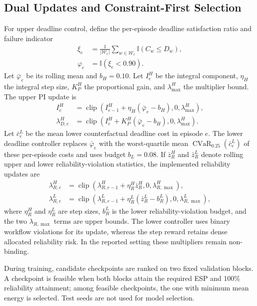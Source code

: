 \documentclass[lettersize,journal]{IEEEtran}
\newcommand{\ind}{\mathbb{I}}
\newcommand{\clip}{\operatorname{clip}}
\newcommand{\cvar}{\operatorname{CVaR}}
\begin{document}
\subsection{Dual Updates and Constraint-First Selection}
For upper deadline control, define the per-episode deadline satisfaction ratio
and failure indicator
\begin{align}
 \xi_e&=\frac{1}{|\mathcal{W}_e|}\sum_{w\in\mathcal{W}_e}
 \ind(C_w\le D_w),\\
 \varphi_e&=\ind(\xi_e<0.90).
 \label{eq:episode_failure}
\end{align}
Let $\bar\varphi_e$ be its rolling mean and $b_H=0.10$. Let $I_e^H$ be the
integral component, $\eta_H$ the integral step size, $K_P^H$ the proportional
gain, and $\lambda_{\max}^H$ the multiplier bound. The upper PI update is
\begin{align}
 I_e^H&=\clip(I_{e-1}^H+\eta_H(\bar\varphi_e-b_H),0,\lambda_{\max}^H),\\
 \lambda_{D,e}^H&=\clip(I_e^H+K_P^H(\bar\varphi_e-b_H),0,\lambda_{\max}^H).
 \label{eq:high_dual}
\end{align}
Let $\bar c_e^L$ be the mean lower counterfactual deadline cost in episode $e$.
The lower deadline controller replaces $\bar\varphi_e$ with the worst-quartile
mean $\cvar_{0.25}(\bar c_e^L)$ of these per-episode costs and uses
budget $b_L=0.08$. If $\bar z_R^H$ and $\bar z_R^L$ denote rolling upper and
lower reliability-violation statistics, the implemented reliability updates are
\begin{align}
 \lambda_{R,e}^H&=\clip(\lambda_{R,e-1}^H+\eta_R^H\bar z_R^H,
 0,\lambda_{R,\max}^H),\\
 \lambda_{R,e}^L&=\clip(\lambda_{R,e-1}^L+\eta_R^L(\bar z_R^L-b_R^L),
 0,\lambda_{R,\max}^L),
 \label{eq:reliability_dual}
\end{align}
where $\eta_R^H$ and $\eta_R^L$ are step sizes, $b_R^L$ is the lower
reliability-violation budget, and the two $\lambda_{R,\max}$ terms are upper
bounds. The lower controller uses binary workflow violations for its update,
whereas the step reward retains dense allocated reliability risk. In the
reported setting these multipliers remain non-binding.

During training, candidate checkpoints are ranked on two fixed validation
blocks. A checkpoint is feasible when both blocks attain the required ESP and
100\% reliability attainment; among feasible checkpoints, the one with minimum
mean energy is selected. Test seeds are not used for model selection.
\end{document}
